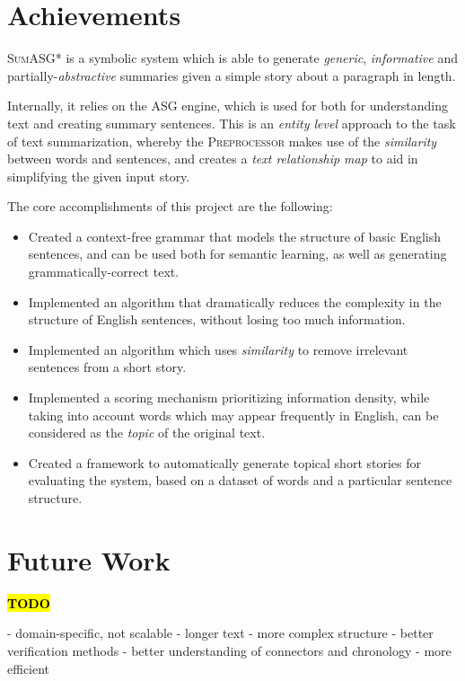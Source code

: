 \section{Achievements}

\textsc{SumASG*} is a symbolic system which is able to generate \textit{generic}, \textit{informative} and partially-\textit{abstractive} summaries given a simple story about a paragraph in length.

Internally, it relies on the ASG engine, which is used for both for understanding text and creating summary sentences. This is an \textit{entity level} approach to the task of text summarization, whereby the \textsc{Preprocessor} makes use of the \textit{similarity} between words and sentences, and creates a \textit{text relationship map} to aid in simplifying the given input story.

The core accomplishments of this project are the following:

\begin{itemize}
\item Created a context-free grammar that models the structure of basic English sentences, and can be used both for semantic learning, as well as generating grammatically-correct text.
\item Implemented an algorithm that dramatically reduces the complexity in the structure of English sentences, without losing too much information.
\item Implemented an algorithm which uses \textit{similarity} to remove irrelevant sentences from a short story.
\item Implemented a scoring mechanism prioritizing information density, while taking into account words which may appear frequently in English, can be considered as the \textit{topic} of the original text.
\item Created a framework to automatically generate topical short stories for evaluating the system, based on a dataset of words and a particular sentence structure.
\end{itemize}

\section{Future Work}

\textcolor{red}{\textbf{\hl{TODO}}}

- domain-specific, not scalable
- longer text
- more complex structure
- better verification methods
- better understanding of connectors and chronology
- more efficient